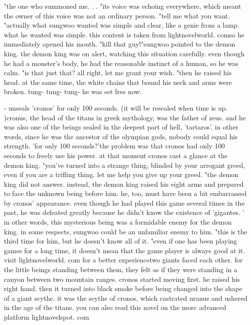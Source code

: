 "the one who summoned me.
.
.
"its voice was echoing everywhere, which meant the owner of this voice was not an ordinary person.
"tell me what you want.
"actually what sungwoo wanted was simple and clear, like a genie from a lamp.
 what he wanted was simple.
 this content is taken from lightnov‌elworld.
c‌omso he immediately opened his mouth.
"kill that guy!"sungwoo pointed to the demon king.
 the demon king was on alert, watching this situation carefully.
 even though he had a monster's body, he had the reasonable instinct of a human, so he was calm.
"is that just that? all right, let me grant your wish.
"then he raised his head.
 at the same time, the white chains that bound his neck and arms were broken.
tung- tung- tung- he was set free now.
 

- unseals 'cronos' for only 100 seconds.
 (it will be resealed when time is up.
)cronus, the head of the titans in greek mythology, was the father of zeus.
and he was also one of the beings sealed in the deepest part of hell, 'tartaros'.
in other words, since he was the ancestor of the olympian gods, nobody could equal his strength.
'for only 100 seconds?'the problem was that cronos had only 100 seconds to freely use his power.
 at that moment cronos cast a glance at the demon king.
"you've turned into a strange thing, blinded by your arrogant greed, even if you are a trifling thing.
 let me help you give up your greed.
"the demon king did not answer.
instead, the demon king raised his eight arms and prepared to face the unknown being before him.
 he, too, must have been a bit embarrassed by cronos' appearance.
even though he had played this game several times in the past, he was defeated greatly because he didn't know the existence of 'gigantes.
' in other words, this mysterious being was a formidable enemy for the demon king.
 in some respects, sungwoo could be an unfamiliar enemy to him.
"this is the third time for him, but he doesn't know all of it.
"even if one has been playing games for a long time, it doesn't mean that the game player is always good at it.
visit lightnovelworld.
c­om for a better experiencetwo giants faced each other.
 for the little beings standing between them, they felt as if they were standing in a canyon between two mountain ranges.
cronos started moving first.
 he raised his right hand.
 then it turned into black smoke before being changed into the shape of a giant scythe.
it was the scythe of cronos, which castrated uranus and ushered in the age of the titans.
 you can also read this novel on the more advanced platform lightnovelspot.
com

 